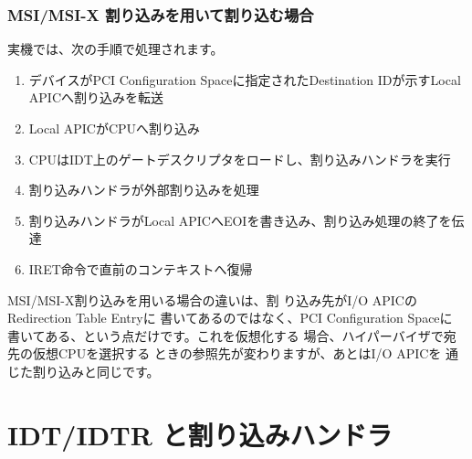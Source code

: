 \subsubsection*{MSI/MSI-X 割り込みを用いて割り込む場合}
 実機では、次の手順で処理されます。

\begin{enumerate}

\item デバイスがPCI Configuration Spaceに指定されたDestination IDが示すLocal APICへ割り込みを転送
\item Local APICがCPUへ割り込み
\item CPUはIDT上のゲートデスクリプタをロードし、割り込みハンドラを実行
\item 割り込みハンドラが外部割り込みを処理
\item 割り込みハンドラがLocal APICへEOIを書き込み、割り込み処理の終了を伝達
\item IRET命令で直前のコンテキストへ復帰
\end{enumerate}


 MSI/MSI-X割り込みを用いる場合の違いは、割
り込み先がI/O APICのRedirection Table Entryに
書いてあるのではなく、PCI Configuration Spaceに
書いてある、という点だけです。これを仮想化する
場合、ハイパーバイザで宛先の仮想CPUを選択する
ときの参照先が変わりますが、あとはI/O APICを
通じた割り込みと同じです。


\section{IDT/IDTR と割り込みハンドラ}

